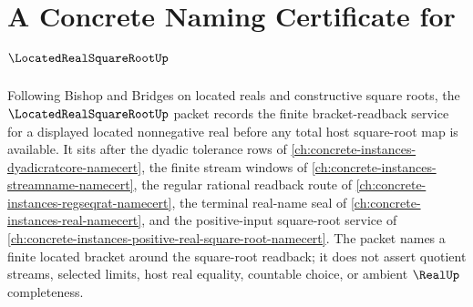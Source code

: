 \chapter{A Concrete Naming Certificate for $\LocatedRealSquareRootUp$}
\label{ch:concrete-instances-located-real-square-root-namecert}

Following Bishop and Bridges on located reals and constructive square roots, the $\LocatedRealSquareRootUp$ packet records the finite bracket-readback service for a displayed located nonnegative real before any total host square-root map is available. It sits after the dyadic tolerance rows of \autoref{ch:concrete-instances-dyadicratcore-namecert}, the finite stream windows of \autoref{ch:concrete-instances-streamname-namecert}, the regular rational readback route of \autoref{ch:concrete-instances-regseqrat-namecert}, the terminal real-name seal of \autoref{ch:concrete-instances-real-namecert}, and the positive-input square-root service of \autoref{ch:concrete-instances-positive-real-square-root-namecert}. The packet names a finite located bracket around the square-root readback; it does not assert quotient streams, selected limits, host real equality, countable choice, or ambient $\RealUp$ completeness.

